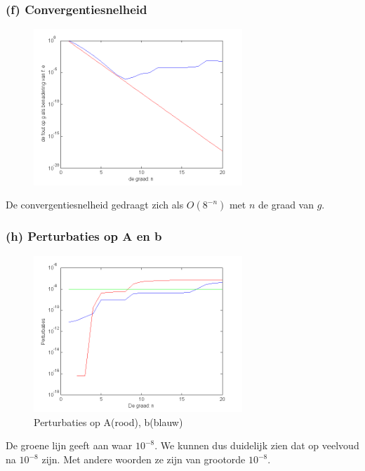 \documentclass[11pt,a4paper]{article}
\begin{document}
\subsubsection*{(f) Convergentiesnelheid}

\begin{figure}[H]
	\centering
	\includegraphics[width=0.7\textwidth]{22f1.png}
	\caption*{}
	\end{figure}
	
De convergentiesnelheid gedraagt zich als $O(8^{-n})$ met $n$ de graad van $g$.

\subsubsection*{(h) Perturbaties op A en b}

\begin{figure}[H]
	\centering
	\includegraphics[width=0.7\textwidth]{22h1.png}
	\caption*{Perturbaties op A(rood), b(blauw)}
	\end{figure}

De groene lijn geeft aan waar $10^{-8}$. We kunnen dus duidelijk zien dat op veelvoud na $10^{-8}$ zijn. Met andere woorden ze zijn van grootorde $10^{-8}$.
\end{document}
